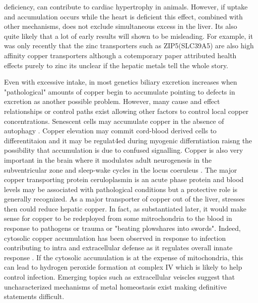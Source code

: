 {deficiency,  can contribute to  cardiac hypertrophy 
in animals.  However, if uptake and accumulation occurs
while the heart is deficient this effect,  combined
with other mechanisms,   does not exclude simultaneous excess in the liver.
Its also quite likely that a lot of early results will shown
to be misleading. For example, it was only recently that the
zinc transporters such as ZIP5(SLC39A5) are also high affinity
copper transporters
\cite{Polesel2023}
although a cotemporary paper attributed health effects purely to 
zinc \cite{Chim_2023} its unclear if the hepatic metals tell
the whole story.

Even with excessive intake, in most genetics
 biliary excretion increases when "pathological"
amounts of copper begin to accumulate
\cite{Chen_Min_Wang_Copper_homeostasis_cuproptosis_2022}
\cite{Hamza_Gitlin_Hepatic_Copper_Transport_2013} pointing
to defects in excretion as another possible problem.
However, many cause and effect relationships or
control paths exist allowing other factors to control
local copper concentrations.  
Senescent cells may accumulate copper in the absence
of autophagy
\cite{Masaldan_Clatworthy_Gamell_Copper_accumulation_senescent_2018}.
Copper elevation may commit 
cord-blood derived cells  to differentitaion \cite{PMID11849228}
and it may be regulat4ed during myogenic differntiation
\cite{PMC5824686} raisng the possibility that accumulation
is due to confused signalling. 
Copper is also very important in the brain
\cite{Gale_Aizenman_physiological_pathophysiological_2024}
 where
it modulates adult neurogenesis in the subventricular zone
\cite{PMC9456150}
and sleep-wake cycles in the locus coeruleus \cite{PMC6008210}.
The major copper transporting protein ceruloplasmin is an 
acute phase protein 
and blood levels may be associated with pathological conditions
\cite{PMID15668644} but a protective role is generally recognized.
As a major transporter of copper out of the liver, 
stresses then could reduce hepatic  copper.
In fact, as substantiated later, it would make sense
for copper to be redeployed from some mitrochondria to the blood
in response to pathogens or trauma or "beating plowshares into swords".
Indeed, cytosolic copper accumulation has been observed in
response to infection contributing to intra and extracellular
defense as it regulates overall innate response
\cite{Lu_Liu_Li_Copper_regulates_host_2024}.
If the cytosolic accumulation is at the expense of
mitochondria, this can  lead to hydrogen
peroxide formation at complex IV  
which is likely to help  control infection. 
Emerging topics  such as extracellular veiscles 
\cite{Bellingham_Guo_Hill_secret_life_2015} suggest
that uncharacterized mechanisms of metal homeostasis
exist making definitive statements difficult.

}
